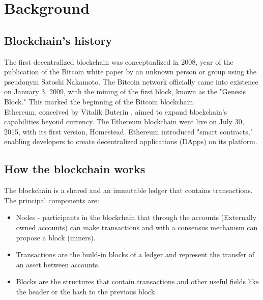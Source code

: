 \documentclass[main.tex]{subfiles}
\begin{document}
\section{Background}\label{sec:background}
\subsection{Blockchain's history}
The first decentralized blockchain was conceptualized in 2008, year of the publication of the Bitcoin white paper by an unknown person or group using the pseudonym Satoshi Nakamoto\cite{nakamoto2009bitcoin}. The Bitcoin network officially came into existence on January 3, 2009, with the mining of the first block, known as the "Genesis Block." This marked the beginning of the Bitcoin blockchain. \\
Ethereum, conceived by Vitalik Buterin \cite{Vitalik:2014}, aimed to expand blockchain's capabilities beyond currency. 
The Ethereum blockchain went live on July 30, 2015, with its first version, Homestead. Ethereum introduced "smart contracts," enabling developers to create decentralized applications (DApps) on its platform.

\subsection{How the blockchain works}
The blockchain is a shared and an immutable ledger that contains transactions. The principal components are:
\begin{itemize}
    \item Nodes - participants in the blockchain that through the accounts (Externally owned accounts) can make transactions and with a consensus mechanism can propose a block (miners).
    \item Transactions are the build-in blocks of a ledger and represent the transfer of an asset between accounts.
    \item Blocks are the structures that contain transactions and other useful fields like the header or the hash to the previous block.
\end{itemize}
\end{document}
